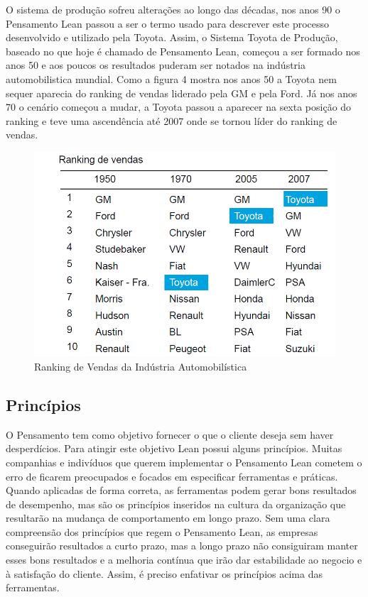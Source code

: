 O sistema de produção sofreu alterações ao longo das décadas, nos anos 90 o Pensamento Lean passou a ser o termo usado para descrever este processo desenvolvido e utilizado pela Toyota. Assim, o Sistema Toyota de Produção, baseado no que hoje é chamado de Pensamento Lean, começou a ser formado nos anos 50 e aos poucos os resultados puderam ser notados na indústria automobilistica mundial. Como a figura 4 mostra nos anos 50 a Toyota nem sequer aparecia do ranking de vendas liderado pela GM e pela Ford. Já nos anos 70 o cenário começou a mudar, a Toyota passou a aparecer na sexta posição do ranking e teve uma ascendência até 2007 onde se tornou líder do ranking de vendas.

\begin{figure}[h]
		\centering
		\label{fig01}
			\includegraphics[scale=0.5]{figuras/ranking.png}
		\caption{Ranking de Vendas da Indústria Automobilística  \cite{ranking}}
\end{figure}

\subsection[Princípios]{Princípios}

O Pensamento tem como objetivo fornecer o que o cliente deseja sem haver desperdícios. Para atingir este objetivo Lean possui alguns princípios. Muitas companhias e indivíduos que querem implementar o Pensamento Lean cometem o erro de ficarem preocupados e focados em especificar ferramentas e práticas. Quando aplicadas de forma correta, as ferramentas podem gerar bons resultados de desempenho, mas são os princípios inseridos na cultura da organização que resultarão na mudança de comportamento em longo prazo. Sem uma clara compreensão dos princípios que regem o Pensamento Lean, as empresas conseguirão resultados a curto prazo, mas a longo prazo não consiguiram manter esses bons resultados e a melhoria contínua que irão dar estabilidade ao negocio e à satisfação do cliente. Assim, é preciso enfativar os princípios acima das ferramentas. 

